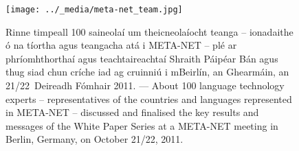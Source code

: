 \begin{figure}[htbp]
  \center
  \texttt{[image: ../\_media/meta-net\_team.jpg]}
  \caption{Rinne timpeall 100 saineolaí um theicneolaíocht teanga -- ionadaithe ó na tíortha agus teangacha atá i META-NET -- plé ar phríomhthorthaí agus teachtaireachtaí Shraith Páipéar Bán agus thug siad chun críche iad ag cruinniú i mBeirlín, an Ghearmáin, an 21/22~Deireadh Fómhair 2011. --- \textcolor{grey1}{About 100 language technology experts -- representatives of the countries and languages represented in META-NET -- discussed and finalised the key results and messages of the White Paper Series at a META-NET meeting in Berlin, Germany, on October 21/22, 2011.}} %
 \medskip
\end{figure}

\cleardoublepage

{}
\label{whitepaperseries}


